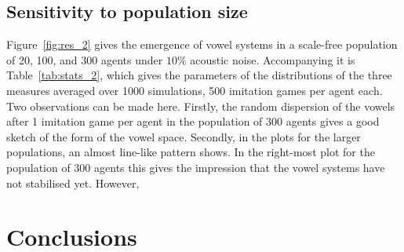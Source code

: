 \documentclass{article}
\begin{document}
\begin{table}[b]
    \caption{Distribution of statistics for 1000 simulations in a scale-free population of various sizes after 500 imitation games
        per agent.}
    \label{tab:stats_2}
\end{table}

\subsection{Sensitivity to population size}
Figure~\ref{fig:res_2} gives the emergence of vowel systems in a scale-free population of 20, 100, and 300 agents under $10\%$ acoustic noise.
Accompanying it is Table~\ref{tab:stats_2}, which gives the parameters of the distributions of the three measures averaged over 1000 simulations, 500 imitation
games per agent each. Two observations can be made here. Firstly, the random dispersion of the vowels after 1 imitation game per agent in the population of 300
agents gives a good sketch of the form of the vowel space. Secondly, in the plots for the larger populations, an almost line-like pattern shows.
In the right-most plot for the population of 300 agents this gives the impression that the vowel systems have not stabilised yet. However,

\section{Conclusions\label{sec:conclusion}}


\end{document}
